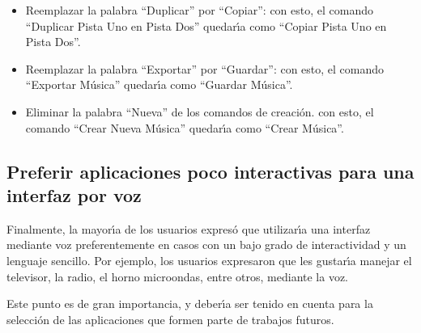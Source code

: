 \begin{itemize}
	\item Reemplazar la palabra ``Duplicar'' por ``Copiar'': con esto, el comando 
	``Duplicar Pista Uno en Pista Dos'' quedar{{\'\i}}a como ``Copiar Pista Uno en Pista Dos''. 
	\item Reemplazar la palabra ``Exportar'' por ``Guardar'': con esto, el comando 
	``Exportar M\'usica'' quedar{{\'\i}}a como ``Guardar M\'usica''.
	\item Eliminar la palabra ``Nueva'' de los comandos de creaci\'on. con esto, el comando 
	``Crear Nueva M\'usica'' quedar{{\'\i}}a como ``Crear M\'usica''.
\end{itemize}

\subsection{Preferir aplicaciones poco interactivas para una interfaz por voz}
Finalmente, la mayor{{\'\i}}a de los usuarios expres\'o que utilizar{{\'\i}}a una interfaz mediante voz
preferentemente en casos con un bajo grado de interactividad y un lenguaje sencillo.
Por ejemplo, los usuarios expresaron que les gustar{{\'\i}}a manejar el televisor, la radio, 
el horno microondas, entre otros, mediante la voz.

Este punto es de gran importancia, y deber{\'\i}a ser tenido en cuenta para la selecci\'on de las aplicaciones
que formen parte de trabajos futuros.
